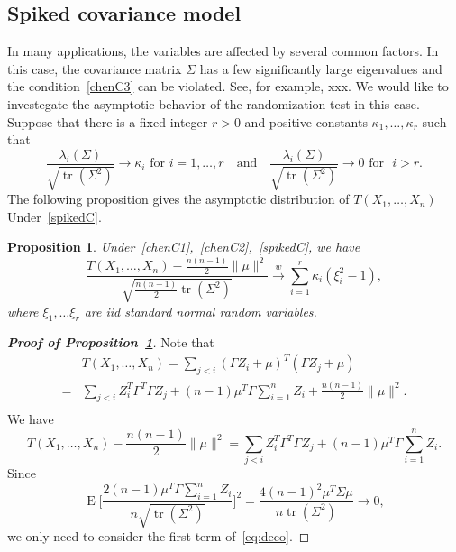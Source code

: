 \documentclass[review]{elsarticle}
\DeclareMathOperator{\mytr}{tr}
\DeclareMathOperator{\myE}{E}
\theoremstyle{plain}
\newtheorem{proposition}{\quad\quad Proposition}
\theoremstyle{definition}
\theoremstyle{remark}
\begin{document}
\subsection{Spiked covariance model}
In many applications, the variables are affected by several common factors.
In this case, the covariance matrix $\Sigma$ has a few significantly large eigenvalues and the condition~\eqref{chenC3} can be violated.
See, for example, xxx.
We would like to investegate the asymptotic behavior of the randomization test in this case.
Suppose that there is a fixed integer $r>0$ and positive constants $\kappa_1,\ldots,\kappa_r$ such that
\begin{equation}\label{spikedC}
    \frac{\lambda_{i}(\Sigma)}{\sqrt{\mytr(\Sigma^2)}}\to \kappa_i \text{ for } i=1,\ldots, r
    \quad
    \text{and}
    \quad
    \frac{\lambda_{i}(\Sigma)}{\sqrt{\mytr(\Sigma^2)}}\to 0 \text{ for }\,\, i> r.
\end{equation}
The following proposition gives the asymptotic distribution of $T(X_1,\ldots,X_n)$ Under~\eqref{spikedC}.
\begin{proposition}\label{prop:spiked1}
    Under~\eqref{chenC1},~\eqref{chenC2},~\eqref{spikedC},
    we have
    $$
    \frac{T(X_1,\ldots,X_n)-\frac{n(n-1)}{2}\|\mu\|^2}{\sqrt{\frac{n(n-1)}{2}\mytr(\Sigma^2)}}
    \xrightarrow{w}\sum_{i=1}^r \kappa_i (\xi_i^2-1),
    $$
    where $\xi_1,\ldots \xi_r$ are iid standard normal random variables.
\end{proposition}
\begin{proof}[\textbf{Proof of Proposition~\ref{prop:spiked1}}]
    Note that
    $$
    \begin{aligned}
        &T(X_1,\ldots,X_n)=\sum_{j<i}  (\Gamma Z_i+\mu)^T (\Gamma Z_j+\mu)
        \\
        =&
\sum_{j<i} Z_i^T \Gamma^T \Gamma Z_j
        +(n-1)\mu^T \Gamma \sum_{i=1}^n Z_i+\frac{n(n-1)}{2}\|\mu\|^2.\\
    \end{aligned}
    $$
    We have
    \begin{equation}\label{eq:deco}
        {T(X_1,\ldots,X_n)-\frac{n(n-1)}{2}\|\mu\|^2}
    ={
\sum_{j<i} Z_i^T \Gamma^T \Gamma Z_j
}
    +
        {(n-1) \mu^T \Gamma \sum_{i=1}^n Z_i}.
    \end{equation}
    Since
    $$
    \myE \Big[\frac{2(n-1) \mu^T \Gamma \sum_{i=1}^n Z_i}{n\sqrt{\mytr(\Sigma^2)}}\Big]^2=\frac{4(n-1)^2 \mu^T \Sigma \mu}{n \mytr(\Sigma^2)}\to 0,
    $$
    we only need to consider the first term of~\eqref{eq:deco}.


\end{proof}
\end{document}
